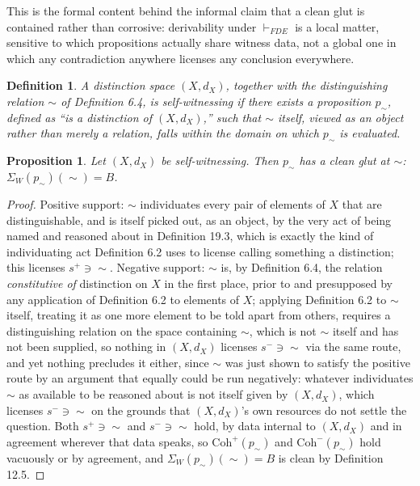 \documentclass[11pt]{book}
\newtheorem{definition}[theorem]{Definition}
\newtheorem{proposition}[theorem]{Proposition}
\begin{document}
This is the formal content behind the informal claim that a clean glut is contained rather than corrosive: derivability under $\vdash_{FDE}$ is a local matter, sensitive to which propositions actually share witness data, not a global one in which any contradiction anywhere licenses any conclusion everywhere.

\begin{definition}
A distinction space $(X, d_X)$, together with the distinguishing relation $\sim$ of Definition 6.4, is \emph{self-witnessing} if there exists a proposition $p_\sim$, defined as ``is a distinction of $(X, d_X)$,'' such that $\sim$ itself, viewed as an object rather than merely a relation, falls within the domain on which $p_\sim$ is evaluated.
\end{definition}

\begin{proposition}
Let $(X, d_X)$ be self-witnessing. Then $p_\sim$ has a clean glut at $\sim$: $\Sigma_W(p_\sim)(\sim) = B$.
\end{proposition}

\begin{proof}
Positive support: $\sim$ individuates every pair of elements of $X$ that are distinguishable, and is itself picked out, as an object, by the very act of being named and reasoned about in Definition 19.3, which is exactly the kind of individuating act Definition 6.2 uses to license calling something a distinction; this licenses $s^+ \ni \sim$. Negative support: $\sim$ is, by Definition 6.4, the relation \emph{constitutive of} distinction on $X$ in the first place, prior to and presupposed by any application of Definition 6.2 to elements of $X$; applying Definition 6.2 to $\sim$ itself, treating it as one more element to be told apart from others, requires a distinguishing relation on the space containing $\sim$, which is not $\sim$ itself and has not been supplied, so nothing in $(X, d_X)$ licenses $s^- \ni \sim$ via the same route, and yet nothing precludes it either, since $\sim$ was just shown to satisfy the positive route by an argument that equally could be run negatively: whatever individuates $\sim$ as available to be reasoned about is not itself given by $(X,d_X)$, which licenses $s^- \ni \sim$ on the grounds that $(X, d_X)$'s own resources do not settle the question. Both $s^+ \ni \sim$ and $s^- \ni \sim$ hold, by data internal to $(X, d_X)$ and in agreement wherever that data speaks, so $\mathrm{Coh}^+(p_\sim)$ and $\mathrm{Coh}^-(p_\sim)$ hold vacuously or by agreement, and $\Sigma_W(p_\sim)(\sim) = B$ is clean by Definition 12.5.
\end{proof}
\end{document}

